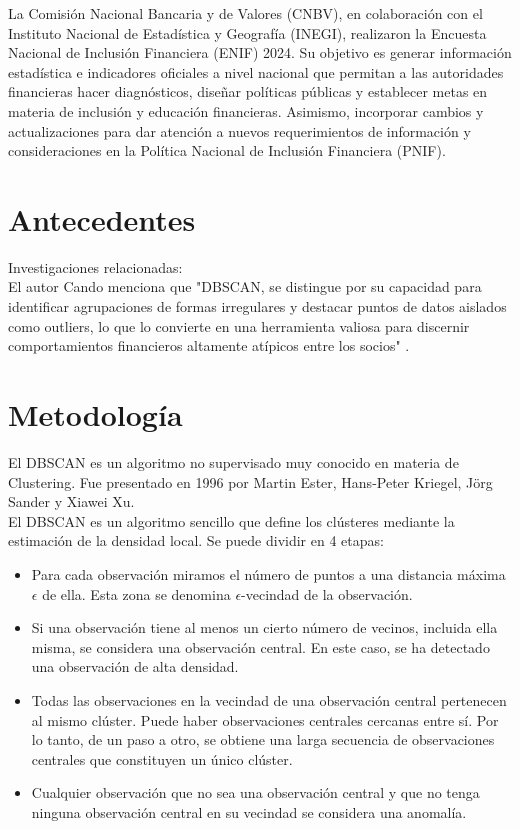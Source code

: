 \documentclass{article}
\begin{document}
La Comisión Nacional Bancaria y de Valores (CNBV), en colaboración con el Instituto Nacional de Estadística y Geografía (INEGI), realizaron la Encuesta Nacional de Inclusión Financiera (ENIF) 2024. Su objetivo es generar información estadística e indicadores oficiales a nivel nacional que permitan a las autoridades financieras hacer diagnósticos, diseñar políticas públicas y establecer metas en materia de inclusión y educación financieras. Asimismo, incorporar cambios y actualizaciones para dar atención a nuevos requerimientos de información y consideraciones en la Política Nacional de Inclusión Financiera (PNIF).

\section{Antecedentes}

Investigaciones relacionadas:\\

El autor Cando \cite{candofacultad} menciona que "DBSCAN, se distingue por su capacidad para identificar agrupaciones de formas irregulares y destacar puntos de datos aislados como outliers, lo
que lo convierte en una herramienta valiosa para discernir comportamientos financieros
altamente atípicos entre los socios" .

\section{Metodología}
El DBSCAN es un algoritmo no supervisado muy conocido en materia de Clustering. Fue presentado en 1996 por Martin Ester, Hans-Peter Kriegel, Jörg Sander y Xiawei Xu.\cite{ml_dbscan_ds}\\

El DBSCAN es un algoritmo sencillo que define los clústeres mediante la estimación de la densidad local. Se puede dividir en 4 etapas:
\begin{itemize}
  \item Para cada observación miramos el número de puntos a una distancia máxima $\epsilon$ de ella. Esta zona se denomina $\epsilon$-vecindad de la observación.
  \item Si una observación tiene al menos un cierto número de vecinos, incluida ella misma, se considera una observación central. En este caso, se ha detectado una observación de alta densidad.
  \item Todas las observaciones en la vecindad de una observación central pertenecen al mismo clúster. Puede haber observaciones centrales cercanas entre sí. Por lo tanto, de un paso a otro, se obtiene una larga secuencia de observaciones centrales que constituyen un único clúster.
  \item Cualquier observación que no sea una observación central y que no tenga ninguna observación central en su vecindad se considera una anomalía.
\end{itemize}
\end{document}
